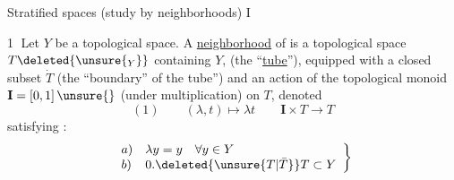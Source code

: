 Stratified spaces (study by 
 neighborhoods)
\textcircled{I}

\textcircled{1} Let $Y$ be a topological space. A  \uline{ neighborhood}
 of 
 is a topological space
$T\deleted{\unsure{_Y}}$ containing $Y$,
(the ``\uline{tube}''), equipped with a closed subset $\dot T$
 (the ``boundary'' of the tube'') and an action of the topological monoid
$\mathbf{I}=[0,1]\,\unsure{}$ (under multiplication) on $T$, denoted
\[
(1)\qquad (\lambda,t)\longmapsto\lambda t
\qquad \mathbf{I}\times T\longrightarrow T
\]
satisfying :
\[
\left.\begin{array}{ll}
a)&\lambda y=y\quad\forall y\in Y\\
b)&0.\deleted{\unsure{T|\bar T}}T\subset Y
\end{array}\right\}
\]

